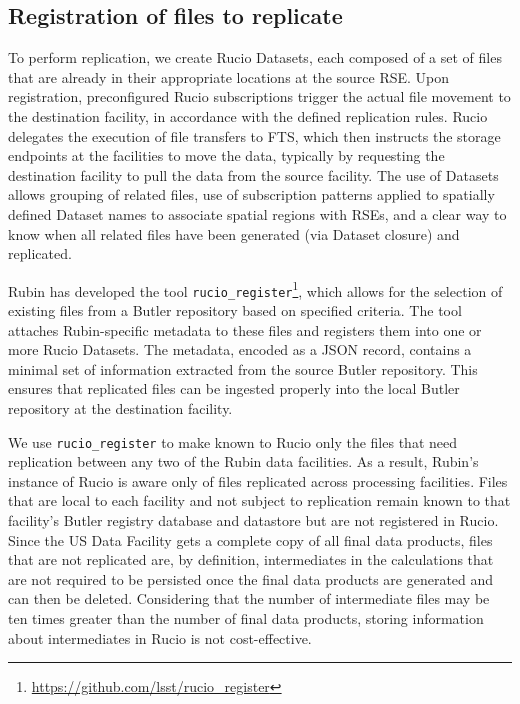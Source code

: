 \documentclass{webofc}
\begin{document}
\subsection{Registration of files to replicate}
\label{registration}

To perform replication, we create Rucio Datasets, each composed of a set of files that are already in their appropriate locations at the source RSE. Upon registration, preconfigured Rucio subscriptions trigger the actual file movement to the destination facility, in accordance with the defined replication rules. Rucio delegates the execution of file transfers to FTS, which then instructs the storage endpoints at the facilities to move the data, typically by requesting the destination facility to pull the data from the source facility. The use of Datasets allows grouping of related files, use of subscription patterns applied to spatially defined Dataset names to associate spatial regions with RSEs, and a clear way to know when all related files have been generated (via Dataset closure) and replicated.

Rubin has developed the tool \texttt{rucio\_register}\footnote{\url{https://github.com/lsst/rucio_register}}, which allows for the selection of existing files from a Butler repository based on specified criteria. The tool attaches Rubin-specific metadata to these files and registers them into one or more Rucio Datasets. The metadata, encoded as a JSON record, contains a minimal set of information extracted from the source Butler repository. This ensures that replicated files can be ingested properly into the local Butler repository at the destination facility.

We use \texttt{rucio\_register} to make known to Rucio only the files that need replication between any two of the Rubin data facilities. As a result, Rubin's instance of Rucio is aware only of files replicated across processing facilities. Files that are local to each facility and not subject to replication remain known to that facility's Butler registry database and datastore but are not registered in Rucio. Since the US Data Facility gets a complete copy of all final data products, files that are not replicated are, by definition, intermediates in the calculations that are not required to be persisted once the final data products are generated and can then be deleted. Considering that the number of intermediate files may be ten times greater than the number of final data products, storing information about intermediates in Rucio is not cost-effective.
\end{document}
